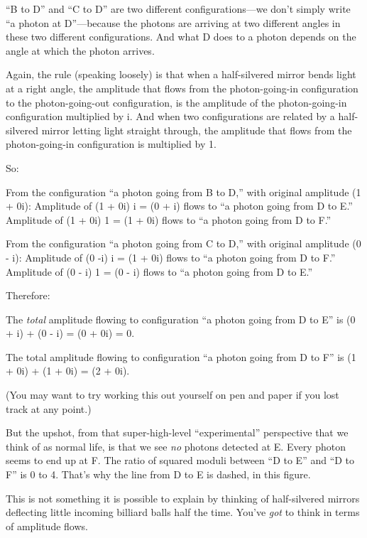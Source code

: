 \bigskip

{
 ``B to D'' and
``C to D'' are two different
configurations---we don't simply write
``a photon at D''---because the
photons are arriving at two different angles in these two different
configurations. And what D does to a photon depends on the angle at
which the photon arrives.}

{
 Again, the rule (speaking loosely) is that when a half-silvered
mirror bends light at a right angle, the amplitude that flows from the
photon-going-in configuration to the photon-going-out configuration, is
the amplitude of the photon-going-in configuration multiplied by i. And
when two configurations are related by a half-silvered mirror letting
light straight through, the amplitude that flows from the
photon-going-in configuration is multiplied by 1.}

{
 So:}

{
 From the configuration ``a photon going from B to
D,'' with original amplitude (1 + 0i): Amplitude of
(1 + 0i) {\texttimes} i = (0 + i) flows to ``a photon
going from D to E.'' Amplitude of (1 + 0i)
{\texttimes} 1 = (1 + 0i) flows to ``a photon going
from D to F.'' }

{
 From the configuration ``a photon going from C to
D,'' with original amplitude (0 - i): Amplitude of (0
-i) {\texttimes} i = (1 + 0i) flows to ``a photon
going from D to F.'' Amplitude of (0 - i)
{\texttimes} 1 = (0 - i) flows to ``a photon going
from D to E.'' }

{
 Therefore:}

{
 The \textit{total} amplitude flowing to configuration
``a photon going from D to E'' is (0
+ i) + (0 - i) = (0 + 0i) = 0.}

{
 The total amplitude flowing to configuration ``a
photon going from D to F'' is (1 + 0i) + (1 + 0i) =
(2 + 0i).}

{
 (You may want to try working this out yourself on pen and paper if
you lost track at any point.)}

{
 But the upshot, from that super-high-level
``experimental'' perspective that we
think of as normal life, is that we see \textit{no} photons detected at
E. Every photon seems to end up at F. The ratio of squared moduli
between ``D to E'' and
``D to F'' is 0 to 4.
That's why the line from D to E is dashed, in this
figure.}

{
 This is not something it is possible to explain by thinking of
half-silvered mirrors deflecting little incoming billiard balls half
the time. You've \textit{got} to think in terms of
amplitude flows.}

